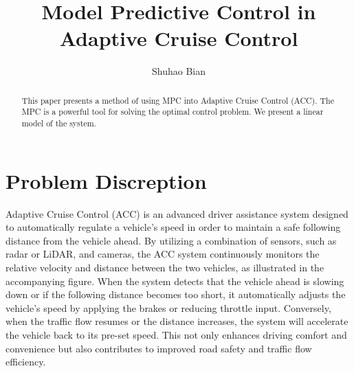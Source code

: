 \documentclass{article}
\title{Model Predictive Control in Adaptive Cruise Control}
\author{Shuhao Bian}
\numberwithin{equation}{section}
\begin{document}
\maketitle

\begin{abstract}
    This paper presents a method of using MPC into Adaptive Cruise Control (ACC).
    The MPC is a powerful tool for solving the optimal control problem.
    We present a linear model of the system. %
\end{abstract}

\section{Problem Discreption}


Adaptive Cruise Control (ACC) is an advanced driver assistance system designed
to automatically regulate a vehicle's speed in order to maintain a safe
following distance from the vehicle ahead. By utilizing a combination of
sensors, such as radar or LiDAR, and cameras, the ACC system continuously
monitors the relative velocity and distance between the two vehicles, as
illustrated in the accompanying figure. When the system detects that the
vehicle ahead is slowing down or if the following distance becomes too short,
it automatically adjusts the vehicle's speed by applying the brakes or reducing
throttle input. Conversely, when the traffic flow resumes or the distance
increases, the system will accelerate the vehicle back to its pre-set speed.
This not only enhances driving comfort and convenience but also contributes to
improved road safety and traffic flow efficiency.
\end{document}
